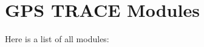 \section{GPS TRACE Modules}
Here is a list of all modules:\begin{CompactList}
\item {}
\end{CompactList}
